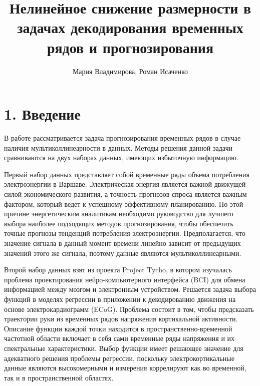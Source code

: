 \documentclass[12pt,twoside]{article}
\title
	{Нелинейное снижение размерности в задачах декодирования временных рядов и прогнозирования}
\author
	{Мария Владимирова, Роман Исаченко}
\begin{document}
\maketitle


\linenumbers
\section{1. Введение}

В работе рассматривается задача прогнозирования временных рядов в случае наличия мультиколлинеарности в данных. Методы решения данной задачи сравниваются на двух наборах данных, имеющих избыточную информацию. 

Первый набор данных представляет собой временные ряды объема потребления электроэнергии в Варшаве. 
Электрическая энергия является важной движущей силой экономического развития, а точность прогнозов спроса является важным фактором, который ведет к успешному эффективному планированию. 
По этой причине энергетическим аналитикам необходимо руководство для лучшего выбора наиболее подходящих методов прогнозирования, чтобы обеспечить точные прогнозы тенденций потребления электроэнергии.
Предполагается, что значение сигнала в данный момент времени линейно зависит от предыдущих значений этого же сигнала, поэтому данные являются мультиколлинеарными.  


Второй набор данных взят из проекта Project Tycho, в котором изучалась проблема проектирования нейро-компьютерного интерфейса (BCI) для обмена информацией между мозгом и электронным устройством. Решается задача выбора функций в моделях регрессии в приложении к декодированию движения на основе электрокардиограмм (ECoG). 
Проблема состоит в том, чтобы предсказать траектории руки из временных рядов напряжения кортикальной активности. Описание функции каждой точки находится в пространственно-временной частотной области включает в себя сами временные ряды напряжения и их спектральные характеристики. Выбор функции имеет решающее значение для адекватного решения проблемы регрессии, поскольку электрокортикальные данные являются высокомерными и измерения коррелируют как во временной, так и в пространственной областях.
\end{document}
